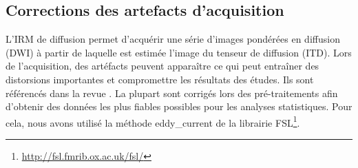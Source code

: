 \subsection{Corrections des artefacts d'acquisition}
L'IRM de diffusion permet d'acquérir une série d'images pondérées en diffusion (DWI)
à partir de laquelle est estimée l'image du tenseur de diffusion (ITD).
Lors de l'acquisition, des artéfacts peuvent apparaître 
ce qui peut entraîner des distorsions importantes et compromettre les résultats des études.
Ils sont référencés dans la revue \cite{Jones2010}.
La plupart sont corrigés lors des pré-traitements afin d'obtenir des données 
les plus fiables possibles pour les analyses statistiques.
Pour cela, nous avons utilisé la méthode \og eddy\_current \fg de la librairie FSL\footnote{\url{http://fsl.fmrib.ox.ac.uk/fsl/}}.

